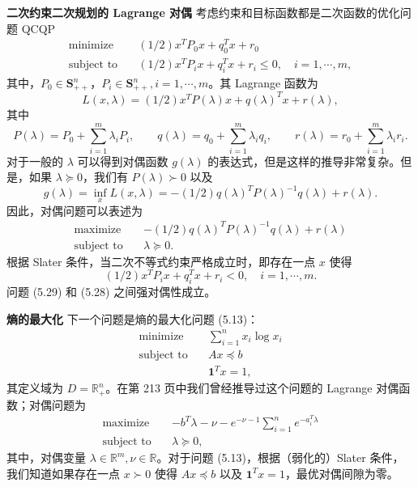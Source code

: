 \documentclass[UTF8,12pt,a4paper,fontset=fandol]{ctexart}
\begin{document}
\noindent\textbf{二次约束二次规划的 Lagrange 对偶}\quad
考虑约束和目标函数都是二次函数的优化问题 QCQP
\begin{equation}
\begin{aligned}
\text{minimize}\quad & (1/2)x^TP_0x+q_0^Tx+r_0\\
\text{subject to}\quad & (1/2)x^TP_ix+q_i^Tx+r_i\leq 0,\quad i=1,\cdots,m,
\end{aligned}
\tag{5.28}
\end{equation}
其中，$P_0\in\mathbf{S}_{++}^n$，$P_i\in\mathbf{S}_{++}^n,i=1,\cdots,m$。其 Lagrange 函数为
\[
L(x,\lambda)=(1/2)x^TP(\lambda)x+q(\lambda)^Tx+r(\lambda),
\]
其中
\[
P(\lambda)=P_0+\sum_{i=1}^m\lambda_iP_i,\qquad
q(\lambda)=q_0+\sum_{i=1}^m\lambda_iq_i,\qquad
r(\lambda)=r_0+\sum_{i=1}^m\lambda_i r_i.
\]
对于一般的 $\lambda$ 可以得到对偶函数 $g(\lambda)$ 的表达式，但是这样的推导非常复杂。但是，如果 $\lambda\succeq 0$，我们有 $P(\lambda)\succ 0$ 以及
\[
g(\lambda)=\inf_x L(x,\lambda)=-(1/2)q(\lambda)^TP(\lambda)^{-1}q(\lambda)+r(\lambda).
\]
因此，对偶问题可以表述为
\begin{equation}
\begin{aligned}
\text{maximize}\quad & -(1/2)q(\lambda)^TP(\lambda)^{-1}q(\lambda)+r(\lambda)\\
\text{subject to}\quad & \lambda\succeq 0.
\end{aligned}
\tag{5.29}
\end{equation}
根据 Slater 条件，当二次不等式约束严格成立时，即存在一点 $x$ 使得
\[
(1/2)x^TP_ix+q_i^Tx+r_i<0,\quad i=1,\cdots,m.
\]
问题 (5.29) 和 (5.28) 之间强对偶性成立。

\noindent\textbf{熵的最大化}\quad
下一个问题是熵的最大化问题 (5.13)：
\[
\begin{aligned}
\text{minimize}\quad & \sum_{i=1}^n x_i\log x_i\\
\text{subject to}\quad & Ax\preceq b\\
& \mathbf{1}^Tx=1,
\end{aligned}
\]
其定义域为 $D=\mathbb{R}_+^n$。在第 213 页中我们曾经推导过这个问题的 Lagrange 对偶函数；对偶问题为
\begin{equation}
\begin{aligned}
\text{maximize}\quad & -b^T\lambda-\nu-e^{-\nu-1}\sum_{i=1}^n e^{-a_i^T\lambda}\\
\text{subject to}\quad & \lambda\succeq 0,
\end{aligned}
\tag{5.30}
\end{equation}
其中，对偶变量 $\lambda\in\mathbb{R}^m,\nu\in\mathbb{R}$。对于问题 (5.13)，根据（弱化的）Slater 条件，我们知道如果存在一点 $x\succ 0$ 使得 $Ax\preceq b$ 以及 $\mathbf{1}^Tx=1$，最优对偶间隙为零。
\end{document}
